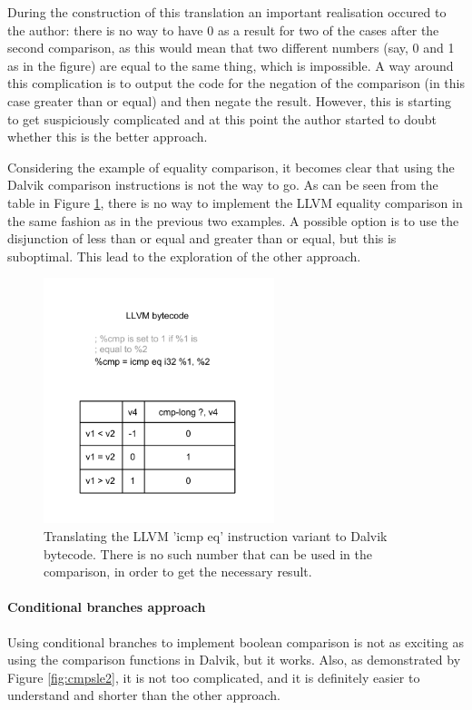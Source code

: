 \documentclass[parskip]{cs4rep}
\begin{document}
During the construction of this translation an important realisation occured to the author: there is no way to have 0 as a result for two of the cases after the second comparison, as this would mean that two different numbers (say, 0 and 1 as in the figure) are equal to the same thing, which is impossible. A way around this complication is to output the code for the negation of the comparison (in this case greater than or equal) and then negate the result. However, this is starting to get suspiciously complicated and at this point the author started to doubt whether this is the better approach.

Considering the example of equality comparison, it becomes clear that using the Dalvik comparison instructions is not the way to go. As can be seen from the table in Figure \ref{fig:cmpeq}, there is no way to implement the LLVM equality comparison in the same fashion as in the previous two examples. A possible option is to use the disjunction of less than or equal and greater than or equal, but this is suboptimal. This lead to the exploration of the other approach.

\begin{figure}[h!]
    \centering
        \includegraphics[width=0.6\textwidth]{cmpeq}
    \caption{Translating the LLVM 'icmp eq' instruction variant to Dalvik bytecode. There is no such number that can be used in the comparison, in order to get the necessary result.}
    \label{fig:cmpeq}
\end{figure}

\paragraph{Conditional branches approach} Using conditional branches to implement boolean comparison is not as exciting as using the comparison functions in Dalvik, but it works. Also, as demonstrated by Figure \ref{fig:cmpsle2}, it is not too complicated, and it is definitely easier to understand and shorter than the other approach.
\end{document}
